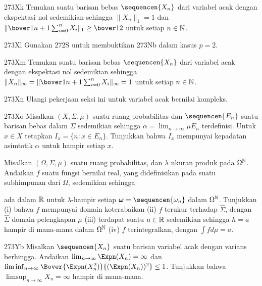 {\spheader 273Xk Temukan suatu barisan bebas $\sequencen{X_n}$ dari
variabel acak dengan ekspektasi nol sedemikian sehingga
$\|X_n\|_1=1$ dan
$\|\bover1{n+1}\sum_{i=0}^nX_i\|_1\ge\bover12$ untuk setiap $n\in\Bbb N$.

\spheader 273Xl Gunakan 272S untuk membuktikan 273Nb dalam kasus $p=2$.

\spheader 273Xm Temukan suatu barisan bebas $\sequencen{X_n}$ dari
variabel acak dengan ekspektasi nol sedemikian sehingga
$\|X_n\|_{\infty}=\|\bover1{n+1}\sum_{i=0}^nX_i\|_{\infty}=1$ untuk
setiap $n\in\Bbb N$.

\spheader 273Xn Ulangi pekerjaan seksi ini untuk variabel acak bernilai
kompleks.

\spheader 273Xo Misalkan $(X,\Sigma,\mu)$ suatu ruang probabilitas dan
$\sequencen{E_n}$ suatu barisan bebas dalam $\Sigma$ sedemikian sehingga
$\alpha=\lim_{n\to\infty}\mu E_n$ terdefinisi. Untuk $x\in X$ tetapkan
$I_x=\{n:x\in E_n\}$. Tunjukkan bahwa $I_x$ mempunyai kepadatan
asimtotik $\alpha$ untuk hampir setiap $x$.

Misalkan $(\Omega,\Sigma,\mu)$ suatu ruang probabilitas, dan $\lambda$
ukuran produk pada $\Omega^{\Bbb N}$. Andaikan $f$ suatu fungsi bernilai
real, yang didefinisikan pada suatu subhimpunan dari $\Omega$, sedemikian
sehingga


\noindent ada dalam $\Bbb R$ untuk $\lambda$-hampir setiap
$\pmb{\omega}=\sequencen{\omega_n}$ dalam $\Omega^{\Bbb N}$. Tunjukkan
(i) bahwa $f$ mempunyai domain koterabaikan (ii) $f$ terukur terhadap
$\hat\Sigma$, dengan $\hat\Sigma$ domain pelengkapan $\mu$ (iii) terdapat
suatu $a\in\Bbb R$ sedemikian sehingga $h=a$ hampir di mana-mana dalam
$\Omega^{\Bbb N}$ (iv) $f$ terintegralkan, dengan $\int fd\mu=a$.

\spheader 273Yb
Misalkan $\sequencen{X_n}$ suatu barisan variabel acak dengan varians
berhingga. Andaikan $\lim_{n\to\infty}\Expn(X_n)=\infty$ dan
$\liminf_{n\to\infty}
\Bover{\Expn(X_n^2)}{(\Expn(X_n))^2}\le 1$.
Tunjukkan bahwa $\limsup_{n\to\infty}X_n=\infty$ hampir di mana-mana.
}%

